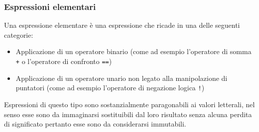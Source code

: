 \subsubsection{Espressioni elementari}
Una espressione elementare è una espressione che ricade in una delle seguenti categorie:
\begin{itemize}
    \item Applicazione di un operatore binario (come ad esempio l'operatore di somma \texttt{+} o l'operatore di confronto \texttt{==})
    \item Applicazione di un operatore unario non legato alla manipolazione di puntatori (come ad esempio l'operatore di negazione logica \texttt{!})
\end{itemize}
Espressioni di questo tipo sono sostanzialmente paragonabili ai valori letterali, nel senso esse sono da immaginarsi 
sostituibili dal loro risultato senza alcuna perdita di significato pertanto esse sono da considerarsi immutabili.